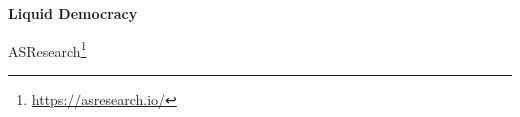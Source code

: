 \documentclass[12pt]{article}
\begin{document}
	\pagestyle{empty}

	\begin{center}
		\vspace*{1.5cm}
		\vspace{0.5cm}
		\textbf{\huge{Liquid Democracy}}

		\vspace{0.5cm}
    ASResearch\footnote{\url{https://asresearch.io/}}
		\textbf{}
	\end{center}






\end{document}
